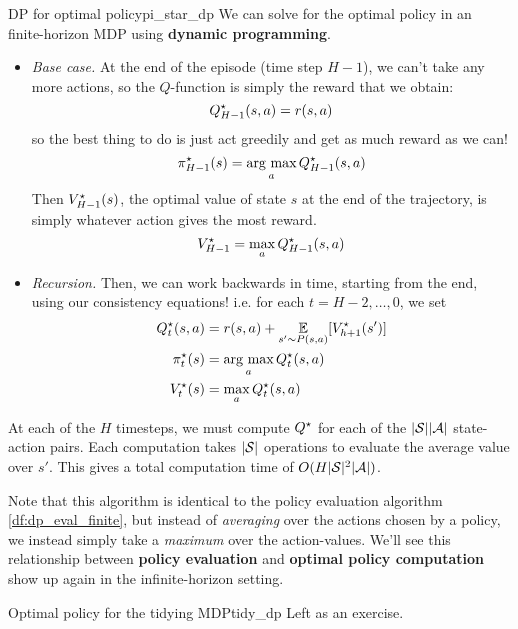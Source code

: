 \documentclass[\main/main]{subfiles}
\begin{document}
\begin{definition}{DP for optimal policy}{pi_star_dp}
    We can solve for the optimal policy in an finite-horizon MDP using \textbf{dynamic programming}.
    
    \begin{itemize}
    \item \emph{Base case.} At the end of the episode (time step $H-1$),
        we can't take any more actions, so the $Q$-function is simply the reward
        that we obtain:
        \[
            \Qopt_{H-1}(s, a) = r(s, a)
        \]
        so the best thing to do is just act greedily
        and get as much reward as we can!
        \[
            \pi^\star_{H-1}(s) = \argmax_a \Qopt_{H-1}(s, a)
        \]
        Then $\Vopt_{H-1}(s)$, the optimal value of state $s$ at the end of the
        trajectory, is simply whatever action gives the most reward.
        \[
            \Vopt_{H-1} = \max_a \Qopt_{H-1}(s, a)
        \]
    
    \item \emph{Recursion.} Then, we can work backwards in time, starting from the
        end, using our consistency equations! i.e. for each $t = H-2, \dots, 0$, we set
        \begin{align*}
            \Qopt_{t}(s, a) &= r(s, a) + \E_{s' \sim P(s, a)} [\Vopt_{h+1}(s')] \\
            \pi^\star_{t}(s) &= \argmax_a \Qopt_{t}(s, a) \\
            \Vopt_{t}(s) &= \max_a \Qopt_{t}(s, a)
        \end{align*}
    \end{itemize}
\end{definition}

At each of the $H$ timesteps, we must compute $\Qopt$ for each of the $|\S| |\A|$ state-action pairs. Each computation takes $|\S|$ operations to evaluate the average value over $s'$. This gives a total computation time of $O(H |\S|^2 |\A|)$.

Note that this algorithm is identical to the policy evaluation algorithm \ref{df:dp_eval_finite}, but instead of \emph{averaging} over the actions chosen by a policy, we instead simply take a \emph{maximum} over the action-values. We'll see this relationship between \textbf{policy evaluation} and \textbf{optimal policy computation} show up again in the infinite-horizon setting.

\begin{example}{Optimal policy for the tidying MDP}{tidy_dp}
    Left as an exercise.
\end{example}
\end{document}
